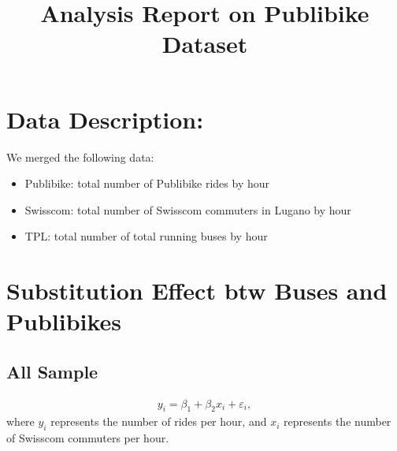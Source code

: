 \documentclass{article}
\title{Analysis Report on Publibike Dataset}
\begin{document}
\maketitle
\newpage
\section{Data Description:} 
We merged the following data:
\begin{itemize}
    \item Publibike: total number of Publibike rides by hour
    \item Swisscom: total number of Swisscom commuters in Lugano by hour
    \item TPL: total number of total running buses by hour
\end{itemize}
\newpage

\section{Substitution Effect btw Buses and Publibikes }
\subsection{All Sample}
\begin{align}
    y_i  = \beta_1 + \beta_2 x_i + \varepsilon_i, \label{model1}
\end{align}
where $y_i$ represents the number of rides per hour, and $x_i$ represents the number of Swisscom commuters per hour.\\
\end{document}
